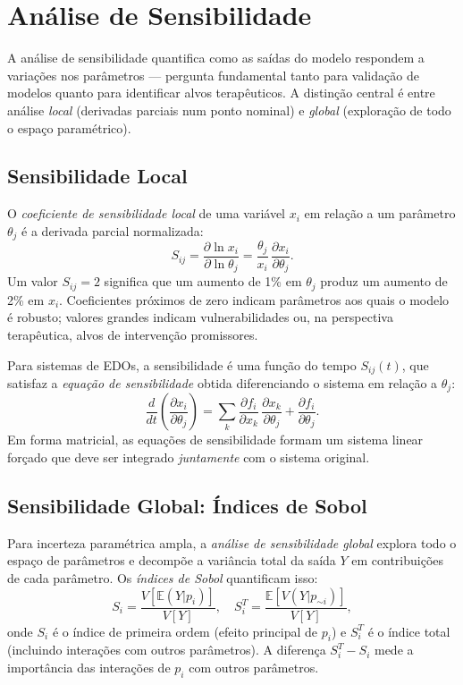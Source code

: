 \section{Análise de Sensibilidade}

A análise de sensibilidade quantifica como as saídas do modelo respondem a variações nos
parâmetros --- pergunta fundamental tanto para validação de modelos quanto para identificar
alvos terapêuticos. A distinção central é entre análise \emph{local} (derivadas parciais
num ponto nominal) e \emph{global} (exploração de todo o espaço paramétrico).

\subsection{Sensibilidade Local}

O \emph{coeficiente de sensibilidade local} de uma variável $x_i$ em relação a um
parâmetro $\theta_j$ é a derivada parcial normalizada:
\begin{equation}
  S_{ij} = \frac{\partial \ln x_i}{\partial \ln \theta_j}
           = \frac{\theta_j}{x_i}\,\frac{\partial x_i}{\partial \theta_j}.
\end{equation}
Um valor $S_{ij} = 2$ significa que um aumento de 1\% em $\theta_j$ produz um aumento de
2\% em $x_i$. Coeficientes próximos de zero indicam parâmetros aos quais o modelo é
robusto; valores grandes indicam vulnerabilidades ou, na perspectiva terapêutica, alvos de
intervenção promissores.

Para sistemas de EDOs, a sensibilidade é uma função do tempo $S_{ij}(t)$, que satisfaz a
\emph{equação de sensibilidade} obtida diferenciando o sistema em relação a $\theta_j$:
\begin{equation}
  \frac{d}{dt}\!\left(\frac{\partial x_i}{\partial \theta_j}\right)
  = \sum_k \frac{\partial f_i}{\partial x_k}\,\frac{\partial x_k}{\partial \theta_j}
    + \frac{\partial f_i}{\partial \theta_j}.
\end{equation}
Em forma matricial, as equações de sensibilidade formam um sistema linear forçado que deve
ser integrado \emph{juntamente} com o sistema original.

\subsection{Sensibilidade Global: Índices de Sobol}

Para incerteza paramétrica ampla, a \emph{análise de sensibilidade global} explora todo o
espaço de parâmetros e decompõe a variância total da saída $Y$ em contribuições de cada
parâmetro. Os \emph{índices de Sobol} quantificam isso:
\begin{equation}
  S_i = \frac{V[\mathbb{E}(Y|p_i)]}{V[Y]}, \quad
  S_i^T = \frac{\mathbb{E}[V(Y|p_{\sim i})]}{V[Y]},
\end{equation}
onde $S_i$ é o índice de primeira ordem (efeito principal de $p_i$) e $S_i^T$ é o índice
total (incluindo interações com outros parâmetros). A diferença $S_i^T - S_i$ mede a
importância das interações de $p_i$ com outros parâmetros.

